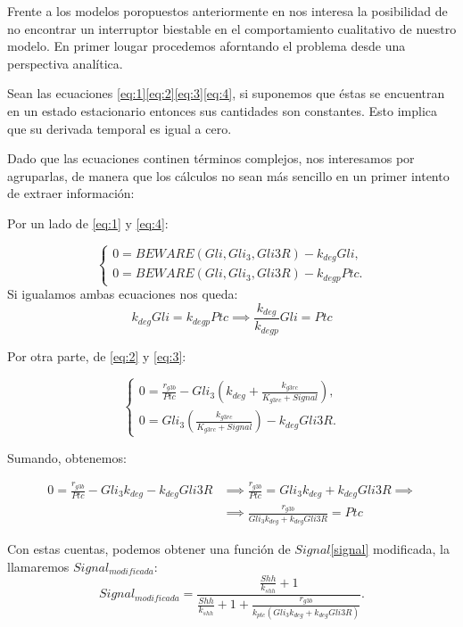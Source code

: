 Frente a los modelos poropuestos anteriormente en \cite{saha,schaffer} nos interesa la posibilidad de no encontrar un interruptor biestable en el comportamiento cualitativo de nuestro modelo. En primer lougar procedemos aforntando el problema desde una perspectiva analítica. 

Sean las ecuaciones \ref{eq:1}\ref{eq:2}\ref{eq:3}\ref{eq:4}, si suponemos que éstas se encuentran en un estado estacionario entonces sus cantidades son constantes. Esto implica que su derivada temporal es igual a cero.

Dado que las ecuaciones continen términos complejos, nos interesamos por agruparlas, de manera que los cálculos no sean más sencillo en un primer intento de extraer información:

Por un lado de \ref{eq:1} y \ref{eq:4}:

$$\begin{cases} 0 = BEWARE(Gli, Gli_3, Gli3R)-k_{deg}Gli, \\0= BEWARE(Gli, Gli_3, Gli3R)-k_{degp}Ptc. \end{cases}$$
Si igualamos ambas ecuaciones nos queda:
\begin{equation}
 k_{deg}Gli=k_{degp}Ptc \implies \frac{k_{deg}}{k_{degp}}Gli=Ptc
\end{equation}

Por otra parte, de \ref{eq:2} y \ref{eq:3}:



$$\begin{cases} 0 = \frac{r_{g3b}}{Ptc}-Gli_3\left(k_{deg}+\frac{k_{g3rc}}{K_{g3rc}+Signal}\right), \\0=Gli_3\left(\frac{k_{g3rc}}{K_{g3rc}+Signal}\right)-k_{deg}Gli3R. \end{cases}$$

Sumando, obtenemos:

\begin{equation}
\begin{split}
0=\frac{r_{g3b}}{Ptc}-Gli_3k_{deg}-k_{deg}Gli3R & \implies \frac{r_{g3b}}{Ptc}=Gli_3k_{deg}+k_{deg}Gli3R\implies
 \\
& \implies \frac{r_{g3b}}{Gli_3k_{deg}+k_{deg}Gli3R}=Ptc
\end{split}
\end{equation}

Con estas cuentas, podemos obtener una función de $Signal$\ref{signal} modificada, la llamaremos $Signal_{modificada}$:
 \begin{equation}
 Signal_{modificada}=\frac{\frac{Shh}{k_{shh}} + 1}{\frac{Shh}{k_{shh}} + 1 + \frac{r_{g3b}}{k_{ptc}(Gli_3k_{deg}+k_{deg}Gli3R)}}.
 \end{equation}
 
